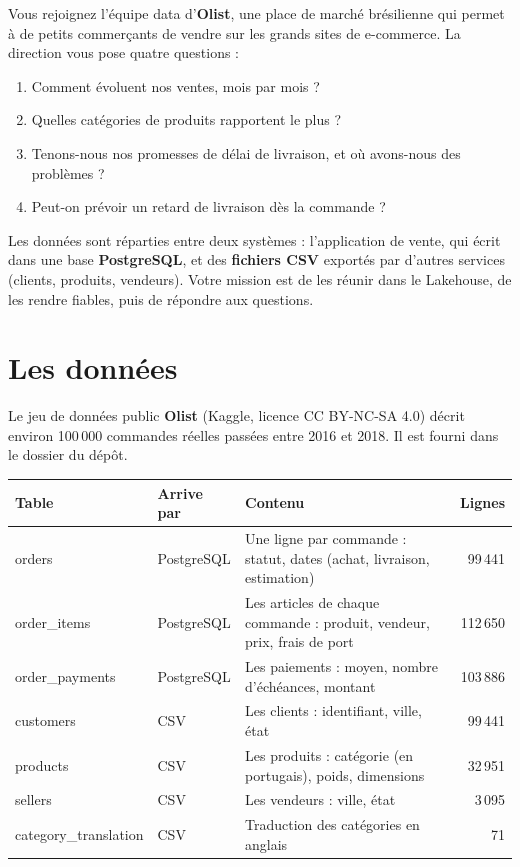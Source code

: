 Vous rejoignez l'équipe data d'\textbf{Olist}, une place de marché brésilienne qui permet à de petits
commerçants de vendre sur les grands sites de e-commerce. La direction vous pose quatre questions :

\begin{enumerate}[leftmargin=*,nosep]
  \item Comment évoluent nos ventes, mois par mois ?
  \item Quelles catégories de produits rapportent le plus ?
  \item Tenons-nous nos promesses de délai de livraison, et où avons-nous des problèmes ?
  \item Peut-on prévoir un retard de livraison dès la commande ?
\end{enumerate}

Les données sont réparties entre deux systèmes : l'application de vente, qui écrit dans une base
\textbf{PostgreSQL}, et des \textbf{fichiers CSV} exportés par d'autres services (clients, produits,
vendeurs). Votre mission est de les réunir dans le Lakehouse, de les rendre fiables, puis de répondre
aux questions.

\section{Les données}

Le jeu de données public \textbf{Olist} (Kaggle, licence CC BY-NC-SA 4.0) décrit environ
100\,000 commandes réelles passées entre 2016 et 2018. Il est fourni dans le dossier
 du dépôt.

\begin{center}
\small
\renewcommand{\arraystretch}{1.25}
\begin{tabularx}{\textwidth}{@{}>{\ttfamily}l l X r@{}}
\toprule
\normalfont\textbf{Table} & \textbf{Arrive par} & \textbf{Contenu} & \textbf{Lignes} \\
\midrule
orders          & PostgreSQL & Une ligne par commande : statut, dates (achat, livraison, estimation) & 99\,441 \\
order\_items    & PostgreSQL & Les articles de chaque commande : produit, vendeur, prix, frais de port & 112\,650 \\
order\_payments & PostgreSQL & Les paiements : moyen, nombre d'échéances, montant & 103\,886 \\
customers       & CSV & Les clients : identifiant, ville, état & 99\,441 \\
products        & CSV & Les produits : catégorie (en portugais), poids, dimensions & 32\,951 \\
sellers         & CSV & Les vendeurs : ville, état & 3\,095 \\
category\_translation & CSV & Traduction des catégories en anglais & 71 \\
\bottomrule
\end{tabularx}
\end{center}

